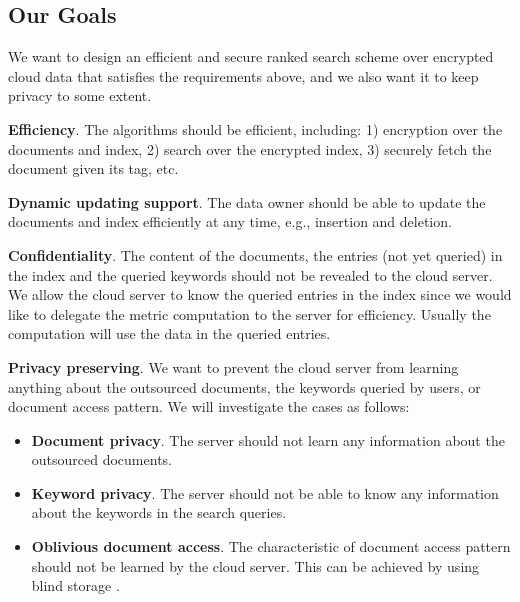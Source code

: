 \documentclass{IEEEtran}
\begin{document}
\subsection{Our Goals}
We want to design an efficient and secure ranked search scheme over encrypted cloud data that satisfies the requirements above, and we also want it to keep privacy to some extent.

\textbf{Efficiency}. The algorithms should be efficient, including: 1) encryption over the documents and index, 2) search over the encrypted index, 3) securely fetch the document given its tag, etc.

\textbf{Dynamic updating support}. The data owner should be able to update the documents and index efficiently at any time, e.g., insertion and deletion.

\textbf{Confidentiality}. The content of the documents, the entries (not yet queried) in the index and the queried keywords should not be revealed to the cloud server. We allow the cloud server to know the queried entries in the index since we would like to delegate the metric computation to the server for efficiency. Usually the computation will use the data in the queried entries.

\textbf{Privacy preserving}. We want to prevent the cloud server from learning anything about the outsourced documents, the keywords queried by users, or document access pattern. We will investigate the cases as follows:
\begin{itemize}
\item \textbf{Document privacy}. The server should not learn any information about the outsourced documents.
\item \textbf{Keyword privacy}. The server should not be able to know any information about the keywords in the search queries.
\item \textbf{Oblivious document access}. The characteristic of document access pattern should not be learned by the cloud server. This can be achieved by using blind storage \cite{NPG14}.
\end{itemize}
\end{document}
